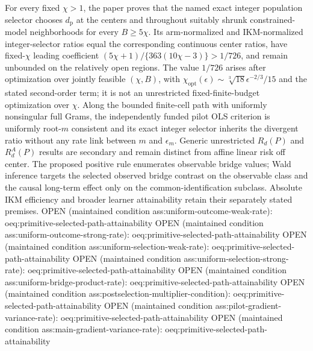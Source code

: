 \documentclass{article}
\begin{document}
For every fixed \(\chi>1\), the paper proves that the named exact integer population selector chooses \(d_{\mathrm p}\) at the centers and throughout suitably shrunk constrained-model neighborhoods for every \(B\ge5\chi\).  Its arm-normalized and IKM-normalized integer-selector ratios equal the corresponding continuous center ratios, have fixed-\(\chi\) leading coefficient \((5\chi+1)/\{363(10\chi-3)\}>1/726\), and remain unbounded on the relatively open regions.  The value \(1/726\) arises after optimization over jointly feasible \((\chi,B)\), with \(\chi_{\mathrm{opt}}(\epsilon)\sim\sqrt[3]{18}\epsilon^{-2/3}/15\) and the stated second-order term; it is not an unrestricted fixed-finite-budget optimization over \(\chi\).  Along the bounded finite-cell path with uniformly nonsingular full Grams, the independently funded pilot OLS criterion is uniformly root-\(m\) consistent and its exact integer selector inherits the divergent ratio without any rate link between \(m\) and \(\epsilon_m\).  Generic unrestricted \(R_d(P)\) and \(R_d^A(P)\) results are secondary and remain distinct from affine linear risk off center.  The proposed positive rule enumerates observable bridge values; Wald inference targets the selected observed bridge contrast on the observable class and the causal long-term effect only on the common-identification subclass.  Absolute IKM efficiency and broader learner attainability retain their separately stated premises.  OPEN (maintained condition ass:uniform-outcome-weak-rate): oeq:primitive-selected-path-attainability OPEN (maintained condition ass:uniform-outcome-strong-rate): oeq:primitive-selected-path-attainability OPEN (maintained condition ass:uniform-selection-weak-rate): oeq:primitive-selected-path-attainability OPEN (maintained condition ass:uniform-selection-strong-rate): oeq:primitive-selected-path-attainability OPEN (maintained condition ass:uniform-bridge-product-rate): oeq:primitive-selected-path-attainability OPEN (maintained condition ass:postselection-multiplier-condition): oeq:primitive-selected-path-attainability OPEN (maintained condition ass:pilot-gradient-variance-rate): oeq:primitive-selected-path-attainability OPEN (maintained condition ass:main-gradient-variance-rate): oeq:primitive-selected-path-attainability
\end{document}
